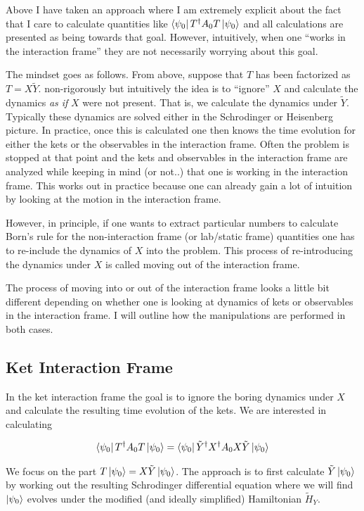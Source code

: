 \documentclass[12pt]{article}
\begin{document}
Above I have taken an approach where I am extremely explicit about the fact that I care to calculate quantities like $\bra{\psi_0}T^{\dag}A_0T\ket{\psi_0}$ and all calculations are presented as being towards that goal. However, intuitively, when one ``works in the interaction frame'' they are not necessarily worrying about this goal.

The mindset goes as follows. From above, suppose that $T$ has been factorized as $T = X \tilde{Y}$. non-rigorously but intuitively the idea is to ``ignore'' $X$ and calculate the dynamics \textit{as if} $X$ were not present. That is, we calculate the dynamics under $\tilde{Y}$. Typically these dynamics are solved either in the Schrodinger or Heisenberg picture. In practice, once this is calculated one then knows the time evolution for either the kets or the observables in the interaction frame. Often the problem is stopped at that point and the kets and observables in the interaction frame are analyzed while keeping in mind (or not..) that one is working in the interaction frame. This works out in practice because one can already gain a lot of intuition by looking at the motion in the interaction frame.

However, in principle, if one wants to extract particular numbers to calculate Born's rule for the non-interaction frame (or lab/static frame) quantities one has to re-include the dynamics of $X$ into the problem. This process of re-introducing the dynamics under $X$ is called moving out of the interaction frame.

The process of moving into or out of the interaction frame looks a little bit different depending on whether one is looking at dynamics of kets or observables in the interaction frame. I will outline how the manipulations are performed in both cases.


\subsection{Ket Interaction Frame}

In the ket interaction frame the goal is to ignore the boring dynamics under $X$ and calculate the resulting time evolution of the kets. We are interested in calculating

\begin{align}
\bra{\psi_0}T^{\dag}A_0T\ket{\psi_0} = \bra{\psi_0}\tilde{Y}^{\dag}X^{\dag}A_0 X \tilde{Y}\ket{\psi_0}
\end{align}

We focus on the part $T \ket{\psi_0} = X \tilde{Y}\ket{\psi_0}$. The approach is to first calculate $\tilde{Y}\ket{\psi_0}$ by working out the resulting Schrodinger differential equation where we will find $\ket{\psi_0}$ evolves under the modified (and ideally simplified) Hamiltonian $\tilde{H}_Y$.
\end{document}
